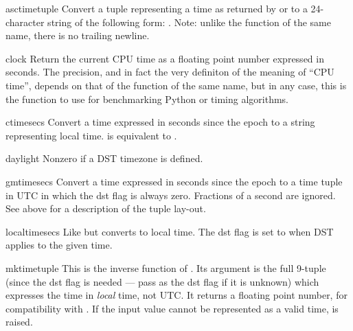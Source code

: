 \begin{funcdesc}{asctime}{tuple}
Convert a tuple representing a time as returned by 
or  to a 24-character string of the following form:
.  Note: unlike the \C{} function of
the same name, there is no trailing newline.
\end{funcdesc}

\begin{funcdesc}{clock}{}
Return the current CPU time as a floating point number expressed in
seconds.  The precision, and in fact the very definiton of the meaning
of ``CPU time'', depends on that of the \C{} function
of the same name, but in any case, this is the function to use for
benchmarking Python or timing algorithms.
\end{funcdesc}

\begin{funcdesc}{ctime}{secs}
Convert a time expressed in seconds since the epoch to a string
representing local time.   is equivalent to
.
\end{funcdesc}

\begin{datadesc}{daylight}
Nonzero if a DST timezone is defined.
\end{datadesc}

\begin{funcdesc}{gmtime}{secs}
Convert a time expressed in seconds since the epoch to a time tuple
in UTC in which the dst flag is always zero.  Fractions of a second are
ignored.  See above for a description of the tuple lay-out.
\end{funcdesc}

\begin{funcdesc}{localtime}{secs}
Like  but converts to local time.  The dst flag is
set to  when DST applies to the given time.
\end{funcdesc}

\begin{funcdesc}{mktime}{tuple}
This is the inverse function of .  Its argument
is the full 9-tuple (since the dst flag is needed --- pass 
as the dst flag if it is unknown) which expresses the time in
\emph{local} time, not UTC.  It returns a floating point number, for
compatibility with .  If the input value cannot be
represented as a valid time,  is raised.
\end{funcdesc}

